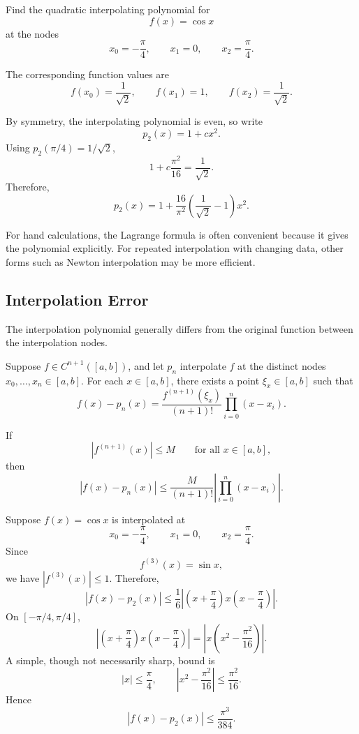 \begin{example}
  Find the quadratic interpolating polynomial for
  \[
    f(x)=\cos x
  \]
  at the nodes
  \[
    x_0=-\frac{\pi}{4},\qquad
    x_1=0,\qquad
    x_2=\frac{\pi}{4}.
  \]

  The corresponding function values are
  \[
    f(x_0)=\frac{1}{\sqrt{2}},\qquad
    f(x_1)=1,\qquad
    f(x_2)=\frac{1}{\sqrt{2}}.
  \]

  By symmetry, the interpolating polynomial is even, so write
  \[
    p_2(x)=1+cx^2.
  \]
  Using \(p_2(\pi/4)=1/\sqrt{2}\),
  \[
    1+c\frac{\pi^2}{16}=\frac{1}{\sqrt{2}}.
  \]
  Therefore,
  \[
    \boxed{
      p_2(x)=1+
      \frac{16}{\pi^2}
      \left(\frac{1}{\sqrt{2}}-1\right)x^2.
    }
  \]
\end{example}

\begin{remark}
  For hand calculations, the Lagrange formula is often convenient because it gives the polynomial explicitly. For repeated interpolation with changing data, other forms such as Newton interpolation may be more efficient.
\end{remark}

\subsection{Interpolation Error}

The interpolation polynomial generally differs from the original function between the interpolation nodes.

\begin{theorem}
  Suppose \(f\in C^{n+1}([a,b])\), and let \(p_n\) interpolate \(f\) at the distinct nodes \(x_0,\ldots,x_n\in[a,b]\). For each \(x\in[a,b]\), there exists a point \(\xi_x\in[a,b]\) such that
  \[
    \boxed{
      f(x)-p_n(x)=
      \frac{f^{(n+1)}(\xi_x)}{(n+1)!}
      \prod_{i=0}^n(x-x_i).
    }
  \]
\end{theorem}

If
\[
  |f^{(n+1)}(x)|\leq M
  \qquad\text{for all }x\in[a,b],
\]
then
\[
  \boxed{
    |f(x)-p_n(x)|
    \leq
    \frac{M}{(n+1)!}
    \left|\prod_{i=0}^n(x-x_i)\right|.
  }
\]

\begin{example}
  Suppose \(f(x)=\cos x\) is interpolated at
  \[
    x_0=-\frac{\pi}{4},\qquad
    x_1=0,\qquad
    x_2=\frac{\pi}{4}.
  \]
  Since
  \[
    f^{(3)}(x)=\sin x,
  \]
  we have \(|f^{(3)}(x)|\leq 1\). Therefore,
  \[
    |f(x)-p_2(x)|
    \leq
    \frac{1}{6}
    \left|
      \left(x+\frac{\pi}{4}\right)x
      \left(x-\frac{\pi}{4}\right)
    \right|.
  \]
  On \([-\pi/4,\pi/4]\),
  \[
    \left|
      \left(x+\frac{\pi}{4}\right)x
      \left(x-\frac{\pi}{4}\right)
    \right|
    =
    \left|x\left(x^2-\frac{\pi^2}{16}\right)\right|.
  \]
  A simple, though not necessarily sharp, bound is
  \[
    |x|\leq\frac{\pi}{4},
    \qquad
    \left|x^2-\frac{\pi^2}{16}\right|
    \leq\frac{\pi^2}{16}.
  \]
  Hence
  \[
    \boxed{
      |f(x)-p_2(x)|\leq\frac{\pi^3}{384}.
    }
  \]
\end{example}

